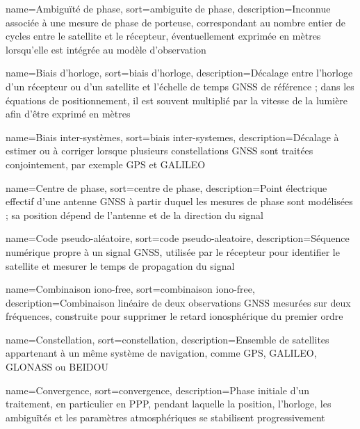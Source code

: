 \makenoidxglossaries

{
    name={Ambiguïté de phase},
    sort={ambiguite de phase},
    description={Inconnue associée à une mesure de phase de porteuse, correspondant au nombre entier de cycles entre le satellite et le récepteur, éventuellement exprimée en mètres lorsqu'elle est intégrée au modèle d'observation}
}

{
    name={Biais d'horloge},
    sort={biais d'horloge},
    description={Décalage entre l'horloge d'un récepteur ou d'un satellite et l'échelle de temps GNSS de référence ; dans les équations de positionnement, il est souvent multiplié par la vitesse de la lumière afin d'être exprimé en mètres}
}

{
    name={Biais inter-systèmes},
    sort={biais inter-systemes},
    description={Décalage à estimer ou à corriger lorsque plusieurs constellations GNSS sont traitées conjointement, par exemple GPS et GALILEO}
}

{
    name={Centre de phase},
    sort={centre de phase},
    description={Point électrique effectif d'une antenne GNSS à partir duquel les mesures de phase sont modélisées ; sa position dépend de l'antenne et de la direction du signal}
}

{
    name={Code pseudo-aléatoire},
    sort={code pseudo-aleatoire},
    description={Séquence numérique propre à un signal GNSS, utilisée par le récepteur pour identifier le satellite et mesurer le temps de propagation du signal}
}

{
    name={Combinaison iono-free},
    sort={combinaison iono-free},
    description={Combinaison linéaire de deux observations GNSS mesurées sur deux fréquences, construite pour supprimer le retard ionosphérique du premier ordre}
}

{
    name={Constellation},
    sort={constellation},
    description={Ensemble de satellites appartenant à un même système de navigation, comme GPS, GALILEO, GLONASS ou BEIDOU}
}

{
    name={Convergence},
    sort={convergence},
    description={Phase initiale d'un traitement, en particulier en PPP, pendant laquelle la position, l'horloge, les ambiguïtés et les paramètres atmosphériques se stabilisent progressivement}
}

